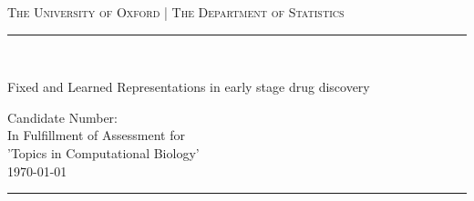 \begin{titlingpage}
\begin{center}
		
		
		
		
		
		\textsc{\centering The University of Oxford | The Department of Statistics}\\[0.2cm]
		
		\newcommand{\HRule}{\rule{\linewidth}{0.5mm}}
		
		
		\begin{flushright}
			\HRule \\[.05cm]
		{  \huge \sc Fixed and Learned Representations in early stage drug discovery\par }
		\vspace*{.6cm}
		{\Large \sc Candidate Number:}\\[0.6cm]
		{\large In Fulfillment of Assessment for \\ 'Topics in Computational Biology'}\\[0.2cm]
		{\today}\\[.05cm]
		\HRule \\[0.4cm]
		\end{flushright}
		
	\end{center}
\begin{abstract}
	\noindent
Der Abstract fasst die zentralen Inhalte der Arbeit zusammen. Eine Wertung oder Interpretation erfolgt nicht. Dies hilft, sich einen groben Überblick über Fragestellung, Vorgehen und Ergebnisse zu verschaffen. Bestandteil sollen die Teile a) Hintergrundinformationen, Fragestellung, Zielsetzung, Forschungskontext, b) Methoden, c) Ergebnisse und d) Schlussfolgerungen, Anwendungsmöglichkeiten sein. Der Text ist knapp, vollständig und präzise, zudem objektiv und ohne persönliche Wertung. Achten Sie auf eine einfache und verständliche Sprache. Alle genannten Inhalte müssen auch im Hauptteil aufgegriffen werden. Den Inhalt objektiv und ohne persönliche Wertung wiedergeben. Gehen Sie auf die wichtigsten Konzepte, Resultate oder Folgerungen ein. Verwenden Sie keine Zitate und verzichten Sie auf Abkürzungen. In der Regel sind ca. 200 Wörter ausreichend.
\end{abstract}
\tableofcontents
\end{titlingpage}



\setcounter{tocdepth}{2}

